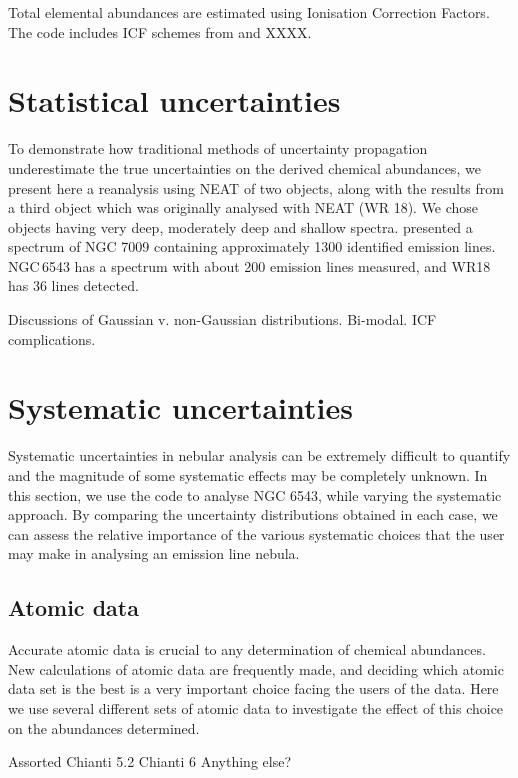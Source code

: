 \documentclass[useAMS,usenatbib]{mn2e}
\begin{document}
Total elemental abundances are estimated using Ionisation Correction Factors.  The code includes ICF schemes from \citet{1994MNRAS.271..257K} and XXXX.

\section{Statistical uncertainties}

To demonstrate how traditional methods of uncertainty propagation underestimate the true uncertainties on the derived chemical abundances, we present here a reanalysis using NEAT of two objects, along with the results from a third object which was originally analysed with NEAT (WR 18).  We chose objects having very deep, moderately deep and shallow spectra.  \citet{2011MNRAS.415..181F} presented a spectrum of NGC 7009 containing approximately 1300 identified emission lines.  NGC\,6543 \citep{2004MNRAS.351.1026W} has a spectrum with about 200 emission lines measured, and WR18 \citep{2011arXiv1108.3800S} has 36 lines detected.

Discussions of Gaussian v. non-Gaussian distributions.  Bi-modal.  ICF complications.

\section{Systematic uncertainties}

Systematic uncertainties in nebular analysis can be extremely difficult to quantify and the magnitude of some systematic effects may be completely unknown.  In this section, we use the code to analyse NGC 6543, while varying the systematic approach.  By comparing the uncertainty distributions obtained in each case, we can assess the relative importance of the various systematic choices that the user may make in analysing an emission line nebula.

\subsection{Atomic data}

Accurate atomic data is crucial to any determination of chemical abundances.  New calculations of atomic data are frequently made, and deciding which atomic data set is the best is a very important choice facing the users of the data.  Here we use several different sets of atomic data to investigate the effect of this choice on the abundances determined.

Assorted
Chianti 5.2
Chianti 6
Anything else?
\end{document}
